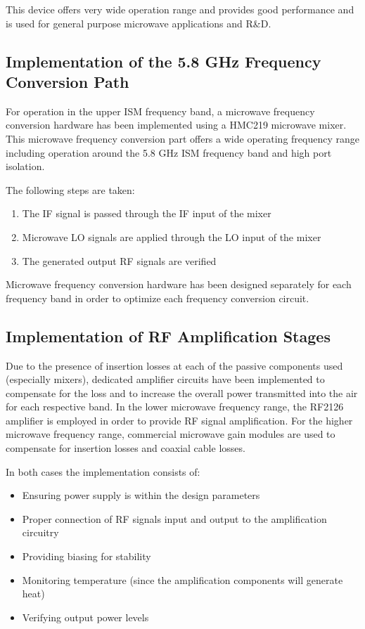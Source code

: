 \documentclass[12pt,a4paper]{report}
\begin{document}
	This device offers very wide operation range and provides good performance and is used for general purpose microwave applications and R\&D.
	
	\subsection{Implementation of the 5.8 GHz Frequency Conversion Path}
	For operation in the upper ISM frequency band, a microwave frequency conversion hardware has been implemented using a HMC219 microwave mixer. This microwave frequency conversion part offers a wide operating frequency range including operation around the 5.8 GHz ISM frequency band and high port isolation.
	
	The following steps are taken:
	\begin{enumerate}
		\item The IF signal is passed through the IF input of the mixer
		\item Microwave LO signals are applied through the LO input of the mixer
		\item The generated output RF signals are verified
	\end{enumerate}
	
	Microwave frequency conversion hardware has been designed separately for each frequency band in order to optimize each frequency conversion circuit.
	
	\subsection{Implementation of RF Amplification Stages}
	Due to the presence of insertion losses at each of the passive components used (especially mixers), dedicated amplifier circuits have been implemented to compensate for the loss and to increase the overall power transmitted into the air for each respective band. In the lower microwave frequency range, the RF2126 amplifier is employed in order to provide RF signal amplification. For the higher microwave frequency range, commercial microwave gain modules are used to compensate for insertion losses and coaxial cable losses.
	
	In both cases the implementation consists of:
	\begin{itemize}
		\item Ensuring power supply is within the design parameters
		\item Proper connection of RF signals input and output to the amplification circuitry
		\item Providing biasing for stability
		\item Monitoring temperature (since the amplification components will generate heat)
		\item Verifying output power levels
	\end{itemize}
	
\end{document}
